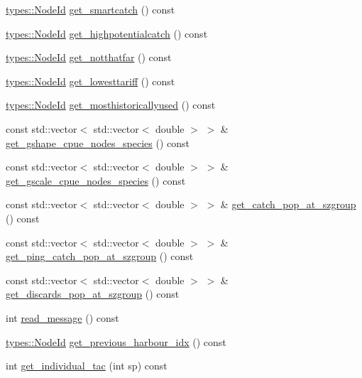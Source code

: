 \begin{DoxyCompactItemize}
\mbox{\hyperlink{classtypes_1_1_node_id}{types\+::\+Node\+Id}} \mbox{\hyperlink{class_vessel_a27dcc764a866ae042b2b53a079f56970}{get\+\_\+smartcatch}} () const
\item 
\mbox{\hyperlink{classtypes_1_1_node_id}{types\+::\+Node\+Id}} \mbox{\hyperlink{class_vessel_a65f1903abb2e855f56e1990011fe17a1}{get\+\_\+highpotentialcatch}} () const
\item 
\mbox{\hyperlink{classtypes_1_1_node_id}{types\+::\+Node\+Id}} \mbox{\hyperlink{class_vessel_aecfade094496d94900ff684c4880c6ac}{get\+\_\+notthatfar}} () const
\item 
\mbox{\hyperlink{classtypes_1_1_node_id}{types\+::\+Node\+Id}} \mbox{\hyperlink{class_vessel_a534b30f53fadff119d25934345ac84da}{get\+\_\+lowesttariff}} () const
\item 
\mbox{\hyperlink{classtypes_1_1_node_id}{types\+::\+Node\+Id}} \mbox{\hyperlink{class_vessel_a8d0bcc579062a96298aabfe2dd08257c}{get\+\_\+mosthistoricallyused}} () const
\item 
const std\+::vector$<$ std\+::vector$<$ double $>$ $>$ \& \mbox{\hyperlink{class_vessel_a8aa34895916268b2d0ce2b59f9713f3b}{get\+\_\+gshape\+\_\+cpue\+\_\+nodes\+\_\+species}} () const
\item 
const std\+::vector$<$ std\+::vector$<$ double $>$ $>$ \& \mbox{\hyperlink{class_vessel_a6ea61e6131a74a7053dff1787c1d084e}{get\+\_\+gscale\+\_\+cpue\+\_\+nodes\+\_\+species}} () const
\item 
const std\+::vector$<$ std\+::vector$<$ double $>$ $>$ \& \mbox{\hyperlink{class_vessel_a98fd681fbbe88e187bb3fea156651308}{get\+\_\+catch\+\_\+pop\+\_\+at\+\_\+szgroup}} () const
\item 
const std\+::vector$<$ std\+::vector$<$ double $>$ $>$ \& \mbox{\hyperlink{class_vessel_a9e257788203a337116177c3a73e94bbe}{get\+\_\+ping\+\_\+catch\+\_\+pop\+\_\+at\+\_\+szgroup}} () const
\item 
const std\+::vector$<$ std\+::vector$<$ double $>$ $>$ \& \mbox{\hyperlink{class_vessel_a0062ade3b9d0efa38a020490848bfc8d}{get\+\_\+discards\+\_\+pop\+\_\+at\+\_\+szgroup}} () const
\item 
int \mbox{\hyperlink{class_vessel_abb1737c51b5eed78305b24e485a8c667}{read\+\_\+message}} () const
\item 
\mbox{\hyperlink{classtypes_1_1_node_id}{types\+::\+Node\+Id}} \mbox{\hyperlink{class_vessel_aad7695f88b9ebfcce2d0c25857dc22c5}{get\+\_\+previous\+\_\+harbour\+\_\+idx}} () const
\item 
int \mbox{\hyperlink{class_vessel_ad9f5fa6c9d27d4ce57ab81909091891e}{get\+\_\+individual\+\_\+tac}} (int sp) const

\end{DoxyCompactItemize}
